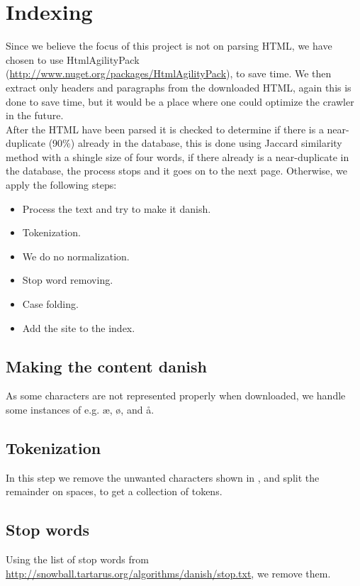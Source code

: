 \section{Indexing}
Since we believe the focus of this project is not on parsing HTML, we have chosen to use HtmlAgilityPack (\url{http://www.nuget.org/packages/HtmlAgilityPack}), to save time. We then extract only headers and paragraphs from the downloaded HTML, again this is done to save time, but it would be a place where one could optimize the crawler in the future.\\

After the HTML have been parsed it is checked  to determine if there is a near-duplicate (90\%) already in the database, this is done using Jaccard similarity method with a shingle size of four words, if there already is a near-duplicate in the database, the process stops and it goes on to the next page. Otherwise, we apply the following steps:

\begin{itemize}
    \item Process the text and try to make it danish.
	\item Tokenization.
    \item We do no normalization.
	\item Stop word removing.
	\item Case folding.
    \item Add the site to the index.
\end{itemize}

\subsection{Making the content danish}
As some characters are not represented properly when downloaded, we handle some instances of e.g. æ, ø, and å.

\subsection{Tokenization}
In this step we remove the unwanted characters shown in , and split the remainder on spaces, to get a collection of tokens.

\subsection{Stop words}
Using the list of stop words from \url{http://snowball.tartarus.org/algorithms/danish/stop.txt}, we remove them.

